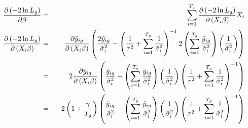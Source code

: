\documentclass[12pt]{article}
\begin{document}
\begin{eqnarray*}
\frac{\partial \left( -2\ln L_{g}\right) }{\partial \beta }
&=&\sum_{i=1}^{T_{g}}\frac{\partial \left( -2\ln L_{g}\right) }{\partial
\left( X_{i}\beta \right) }X_{i} \\
\frac{\partial \left( -2\ln L_{g}\right) }{\partial \left( X_{i}\beta
\right) } &=&\frac{\partial \tilde{y}_{ig}}{\partial \left( X_{i}\beta
\right) }\left( \frac{2\tilde{y}_{ig}}{\tilde{\sigma}_{i}^{2}}-\left( \frac{1%
}{\tau ^{2}}+\sum_{i=1}^{T_{g}}\frac{1}{\tilde{\sigma}_{i}^{2}}\right)
^{-1}2\left( \sum_{i=1}^{T_{g}}\frac{\tilde{y}_{ig}}{\tilde{\sigma}_{i}^{2}}%
\right) \left( \frac{1}{\tilde{\sigma}_{i}^{2}}\right) \right) \\
&=&2\frac{\partial \tilde{y}_{ig}}{\partial \left( X_{i}\beta \right) }%
\left( \frac{\tilde{y}_{ig}}{\tilde{\sigma}_{i}^{2}}-\left(
\sum_{i=1}^{T_{g}}\frac{\tilde{y}_{ig}}{\tilde{\sigma}_{i}^{2}}\right)
\left( \frac{1}{\tilde{\sigma}_{i}^{2}}\right) \left( \frac{1}{\tau ^{2}}%
+\sum_{i=1}^{T_{g}}\frac{1}{\tilde{\sigma}_{i}^{2}}\right) ^{-1}\right) \\
&=&-2\left( 1+\frac{\gamma }{T_{g}}\right) \left( \frac{\tilde{y}_{ig}}{%
\tilde{\sigma}_{i}^{2}}-\left( \sum_{i=1}^{T_{g}}\frac{\tilde{y}_{ig}}{%
\tilde{\sigma}_{i}^{2}}\right) \left( \frac{1}{\tilde{\sigma}_{i}^{2}}%
\right) \left( \frac{1}{\tau ^{2}}+\sum_{i=1}^{T_{g}}\frac{1}{\tilde{\sigma}%
_{i}^{2}}\right) ^{-1}\right)
\end{eqnarray*}

\bigskip
\end{document}
